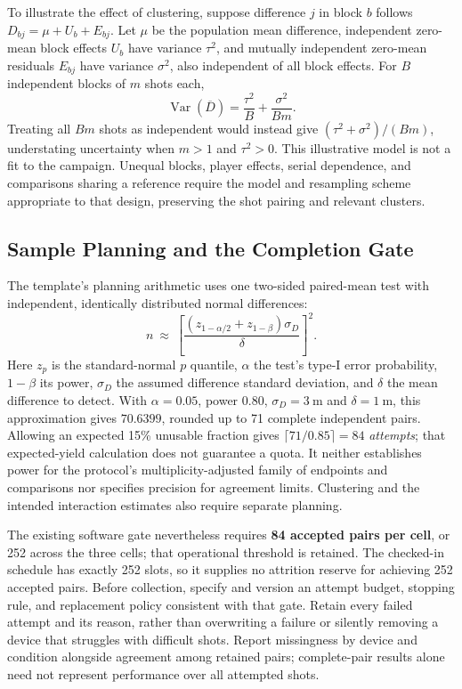 To illustrate the effect of clustering, suppose difference $j$ in block $b$ follows $D_{bj}=\mu+U_b+E_{bj}$.
Let $\mu$ be the population mean difference, independent zero-mean block effects $U_b$ have variance $\tau^2$, and mutually independent zero-mean residuals $E_{bj}$ have variance $\sigma^2$, also independent of all block effects.
For $B$ independent blocks of $m$ shots each,
\begin{equation}
\operatorname{Var}(\overline D)=\frac{\tau^2}{B}+\frac{\sigma^2}{Bm}.
\label{eq:paired-block-mean}
\end{equation}
Treating all $Bm$ shots as independent would instead give $(\tau^2+\sigma^2)/(Bm)$, understating uncertainty when $m>1$ and $\tau^2>0$.
This illustrative model is not a fit to the campaign.
Unequal blocks, player effects, serial dependence, and comparisons sharing a reference require the model and resampling scheme appropriate to that design, preserving the shot pairing and relevant clusters.

\subsection{Sample Planning and the Completion Gate}

The template's planning arithmetic uses one two-sided paired-mean test with independent, identically distributed normal differences:
\begin{equation}
n\ \approx\ \left[\frac{(z_{1-\alpha/2}+z_{1-\beta})\sigma_D}{\delta}\right]^2.
\label{eq:paired-sample-planning}
\end{equation}
Here $z_p$ is the standard-normal $p$ quantile, $\alpha$ the test's type-I error probability, $1-\beta$ its power, $\sigma_D$ the assumed difference standard deviation, and $\delta$ the mean difference to detect.
With $\alpha=0.05$, power $0.80$, $\sigma_D=\SI{3}{\meter}$ and $\delta=\SI{1}{\meter}$, this approximation gives $70.6399$, rounded up to 71 complete independent pairs.
Allowing an expected 15\% unusable fraction gives $\lceil71/0.85\rceil=84$ \emph{attempts}; that expected-yield calculation does not guarantee a quota.
It neither establishes power for the protocol's multiplicity-adjusted family of endpoints and comparisons nor specifies precision for agreement limits.
Clustering and the intended interaction estimates also require separate planning.

The existing software gate nevertheless requires \textbf{84 accepted pairs per cell}, or 252 across the three cells; that operational threshold is retained.
The checked-in schedule has exactly 252 slots, so it supplies no attrition reserve for achieving 252 accepted pairs.
Before collection, specify and version an attempt budget, stopping rule, and replacement policy consistent with that gate.
Retain every failed attempt and its reason, rather than overwriting a failure or silently removing a device that struggles with difficult shots.
Report missingness by device and condition alongside agreement among retained pairs; complete-pair results alone need not represent performance over all attempted shots.

